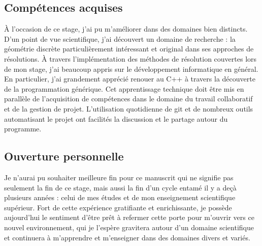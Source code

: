 \subsection{Compétences acquises}

À l'occasion de ce stage, j'ai pu m'améliorer dans des domaines bien distincts. D'un point de vue scientifique, j'ai découvert un domaine de recherche : la géométrie discrète particulièrement intéressant et original dans ses approches de résolutions. À travers l'implémentation des méthodes de résolution couvertes lors de mon stage, j'ai beaucoup appris sur le développement informatique en général. En particulier, j'ai grandement apprécié renouer au C++ à travers la découverte de la programmation générique. Cet apprentissage technique doit être mis en parallèle de l’acquisition de compétences dans le domaine du travail collaboratif et de la gestion de projet. L'utilisation quotidienne de git et de nombreux outils automatisant le projet ont facilités la discussion et le partage autour du programme.

\subsection{Ouverture personnelle}

Je n'aurai pu souhaiter meilleure fin pour ce manuscrit qui ne signifie pas seulement la fin de ce stage, mais aussi la fin d'un cycle entamé il y a deçà plusieurs années : celui de mes études et de mon enseignement scientifique supérieur. Fort de cette expérience gratifiante et enrichissante, je possède aujourd'hui le sentiment d'être prêt à refermer cette porte pour m'ouvrir vers ce nouvel environnement, qui je l'espère gravitera autour d'un domaine scientifique et continuera à m'apprendre et m'enseigner dans des domaines divers et variés.

